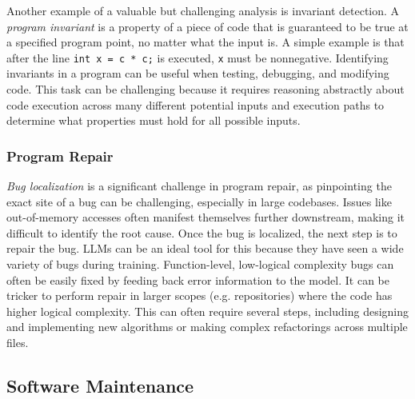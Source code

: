 Another example of a valuable but challenging analysis is invariant detection. A \textit{program invariant} is a property of a piece of code that is guaranteed to be true at a specified program point, no matter what the input is. A simple example is that after the line \texttt{int x = c * c;} is executed, \texttt{x} must be nonnegative. Identifying invariants in a program can be useful when testing, debugging, and modifying code. This task can be challenging because it requires reasoning abstractly about code execution across many different potential inputs and execution paths to determine what properties must hold for all possible inputs.



\subsubsection{Program Repair}

\textit{Bug localization} is a significant challenge in program repair, as pinpointing the exact site of a bug can be challenging, especially in large codebases. Issues like out-of-memory accesses often manifest themselves further downstream, making it difficult to identify the root cause. Once the bug is localized, the next step is to repair the bug. LLMs can be an ideal tool for this because they have seen a wide variety of bugs during training. Function-level, low-logical complexity bugs can often be easily fixed by feeding back error information to the model. It can be tricker to perform repair in larger scopes (e.g. repositories) where the code has higher logical complexity. This can often require several steps, including designing and implementing new algorithms or making complex refactorings across multiple files.

\subsection{Software Maintenance}


